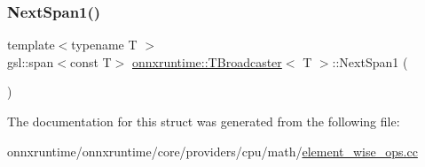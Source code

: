 \mbox{\label{structonnxruntime_1_1TBroadcaster_ad3857715179a0ccf354ca60d69890647}} 
\subsubsection{\texorpdfstring{Next\+Span1()}{NextSpan1()}}
{\footnotesize\ttfamily template$<$typename T $>$ \\
gsl\+::span$<$const T$>$ \mbox{\hyperlink{structonnxruntime_1_1TBroadcaster}{onnxruntime\+::\+T\+Broadcaster}}$<$ T $>$\+::Next\+Span1 (\begin{DoxyParamCaption}{ }\end{DoxyParamCaption})\hspace{0.3cm}{\ttfamily [inline]}}



The documentation for this struct was generated from the following file\+:\begin{DoxyCompactItemize}
\item 
onnxruntime/onnxruntime/core/providers/cpu/math/\mbox{\hyperlink{element__wise__ops_8cc}{element\+\_\+wise\+\_\+ops.\+cc}}\end{DoxyCompactItemize}
